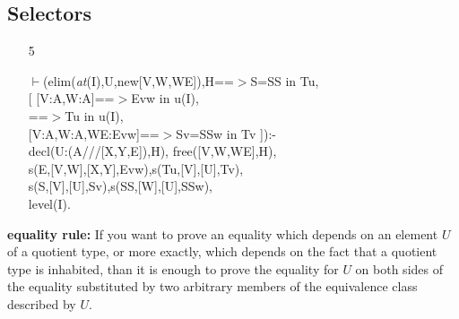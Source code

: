 \documentclass[11pt]{report}
\begin{document}
 \subsection{Selectors}
 \begin{enumerate}
 \item[5]
\begin{sf}\begin{tabbing}
$\vdash$(elim(\mbox{\it at}(I),U,new[V,W,WE]),H==$>$S=SS in Tu,\\[-0.15ex]
\hspace{2em}[ [V:A,W:A]==$>$Evw in u(I),\\[-0.15ex]
\hspace{3em}==$>$Tu in u(I),\\[-0.15ex]
\hspace{3em}[V:A,W:A,WE:Evw]==$>$Sv=SSw in Tv ]):-\\[-0.15ex]
\hspace{2em}decl(U:(A///[X,Y,E]),H), free([V,W,WE],H),\\[-0.15ex]
\hspace{2em}s(E,[V,W],[X,Y],Evw),s(Tu,[V],[U],Tv),\\[-0.15ex]
\hspace{2em}s(S,[V],[U],Sv),s(SS,[W],[U],SSw),\\[-0.15ex]
\hspace{2em}level(I).
\end{tabbing}\end{sf}

 \end{enumerate}
 {\bf equality rule:}
 If you want to prove an equality which depends on  an element $U$
 of a quotient type, or more exactly, which depends on the
 fact that a quotient type is inhabited, than it is enough to
 prove the equality for $U$ on both sides of the equality substituted
 by two arbitrary members of the equivalence class described by $U$.
\end{document}
